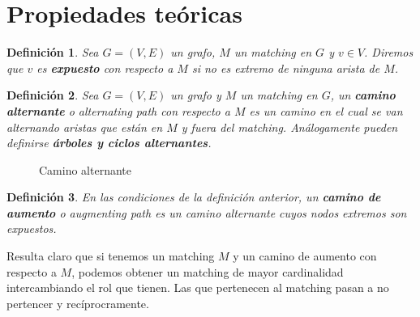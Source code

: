 \documentclass[twoside,a4paper,openright,12pt]{book}
\newtheorem{defi}{Definici\'on}[section]
\begin{document}
\section{Propiedades teóricas}
\begin{defi}
Sea $G=(V,E)$ un grafo, $M$ un matching en $G$ y $v\in V$. Diremos que $v$ es \textbf{expuesto} con respecto a $M$ si no es extremo de ninguna arista de $M$.
\end{defi}
\begin{defi}
Sea $G=(V,E)$ un grafo y $M$ un matching en $G$, un \textbf{camino alternante} o \textit{alternating path} con respecto a $M$ es un camino en el cual se van alternando aristas que están en $M$ y fuera del matching. Análogamente pueden definirse \textbf{árboles y ciclos alternantes}.
\end{defi}
\begin{figure}[h!]
\centering
{}
\caption{Camino alternante}
\end{figure}

\begin{defi}
En las condiciones de la definición anterior,  un \textbf{camino de aumento} o \textit{augmenting path} es un camino alternante cuyos nodos extremos son expuestos.
\end{defi}
Resulta claro que si tenemos un matching $M$ y un camino de aumento con respecto a $M$, podemos obtener un matching de mayor cardinalidad intercambiando el rol que tienen. Las que pertenecen al matching pasan a no pertencer y recíprocramente.
\end{document}
